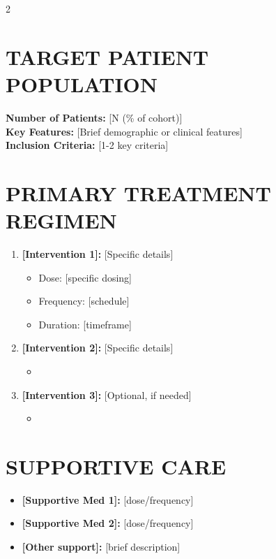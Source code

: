 \documentclass[10pt,letterpaper]{article}
\begin{document}
\begin{multicols}{2}


\section*{TARGET PATIENT POPULATION}
{\small
\textbf{Number of Patients:} [N (\% of cohort)]\\
\textbf{Key Features:} [Brief demographic or clinical features]\\
\textbf{Inclusion Criteria:} [1-2 key criteria]
}

\section*{PRIMARY TREATMENT REGIMEN}
{\small
\begin{enumerate}[leftmargin=12pt]
    \item \textbf{[Intervention 1]:} [Specific details]
    \begin{itemize}
        \item Dose: [specific dosing]
        \item Frequency: [schedule]
        \item Duration: [timeframe]
    \end{itemize}
    
    \item \textbf{[Intervention 2]:} [Specific details]
    \begin{itemize}
        \item [Key parameters]
    \end{itemize}
    
    \item \textbf{[Intervention 3]:} [Optional, if needed]
    \begin{itemize}
        \item [Key parameters]
    \end{itemize}
\end{enumerate}
}

\section*{SUPPORTIVE CARE}
{\small
\begin{itemize}
    \item \textbf{[Supportive Med 1]:} [dose/frequency]
    \item \textbf{[Supportive Med 2]:} [dose/frequency]
    \item \textbf{[Other support]:} [brief description]
\end{itemize}
}


\end{multicols}
\end{document}
